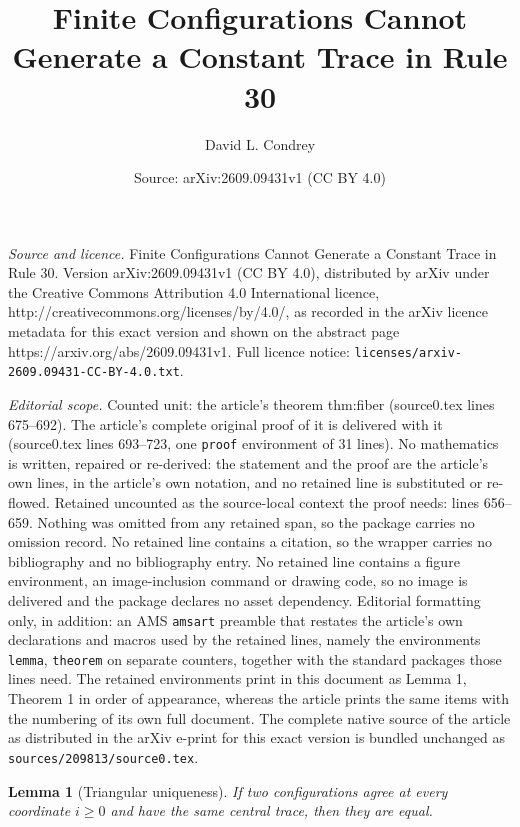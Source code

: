 \documentclass[10pt,a4paper]{amsart}
\title{\vspace{-2.2em}Finite Configurations Cannot Generate a Constant Trace in Rule 30}
\author{David L. Condrey}
\date{Source: arXiv:2609.09431v1 (CC BY 4.0)}
\newtheorem{lemma}{Lemma}
\begin{document}
\maketitle

\noindent\emph{Source and licence.} \vspace{-2.2em}Finite Configurations Cannot Generate a Constant Trace in Rule 30. Version arXiv:2609.09431v1 (CC BY 4.0), distributed by arXiv under the Creative Commons Attribution 4.0 International licence, http://creativecommons.org/licenses/by/4.0/, as recorded in the arXiv licence metadata for this exact version and shown on the abstract page https://arxiv.org/abs/2609.09431v1. Full licence notice: \texttt{licenses/arxiv-2609.09431-CC-BY-4.0.txt}.\par\smallskip

\noindent\textit{Editorial scope.} Counted unit: the article's theorem thm:fiber (source0.tex lines 675--692). The article's complete original proof of it is delivered with it (source0.tex lines 693--723, one \texttt{proof} environment of 31 lines). No mathematics is written, repaired or re-derived: the statement and the proof are the article's own lines, in the article's own notation, and no retained line is substituted or re-flowed.  Retained uncounted as the source-local context the proof needs: lines 656--659.  Nothing was omitted from any retained span, so the package carries no omission record.  No retained line contains a citation, so the wrapper carries no bibliography and no bibliography entry.  No retained line contains a figure environment, an image-inclusion command or drawing code, so no image is delivered and the package declares no asset dependency.  Editorial formatting only, in addition: an AMS \texttt{amsart} preamble that restates the article's own declarations and macros used by the retained lines, namely the environments \texttt{lemma}, \texttt{theorem} on separate counters, together with the standard packages those lines need.  The retained environments print in this document as Lemma 1, Theorem 1 in order of appearance, whereas the article prints the same items with the numbering of its own full document.  The complete native source of the article as distributed in the arXiv e-print for this exact version is bundled unchanged as \texttt{sources/209813/source0.tex}.
\begin{lemma}[Triangular uniqueness]\label{lem:unique}
If two configurations agree at every coordinate $i\geq0$ and have the same
central trace, then they are equal.
\end{lemma}
\end{document}
